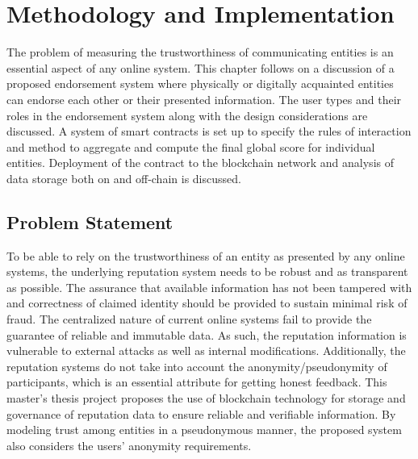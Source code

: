 \chapter{Methodology and Implementation} \label{ch:method}
The problem of measuring the trustworthiness of communicating entities is an
essential aspect of any online system. This chapter follows on a discussion of
a proposed endorsement system where physically or digitally acquainted entities
can endorse each other or their presented information. The user types and their
roles in the endorsement system along with the design considerations are
discussed. A system of smart contracts is set up to specify the rules of
interaction and method to aggregate and compute the final global score for
individual entities. Deployment of the contract to the blockchain network and
analysis of data storage both on and off-chain is discussed. 
\section{Problem Statement}
To be able to rely on the trustworthiness of an entity as presented by any
online systems, the underlying reputation system needs to be robust and as
transparent as possible. The assurance that available information has not been
tampered with and correctness of claimed identity should be provided to sustain
minimal risk of fraud.  The centralized nature of current online systems fail
to provide the guarantee of reliable and immutable data. As such, the
reputation information is vulnerable to external attacks as well as internal
modifications. Additionally, the reputation systems do not take into account
the anonymity/pseudonymity of participants, which is an essential attribute for
getting honest feedback.  This master's thesis project proposes the use of
blockchain technology for storage and governance of reputation data to ensure
reliable and verifiable information. By modeling trust among entities in a
pseudonymous manner, the proposed system also considers the users' anonymity
requirements. 
